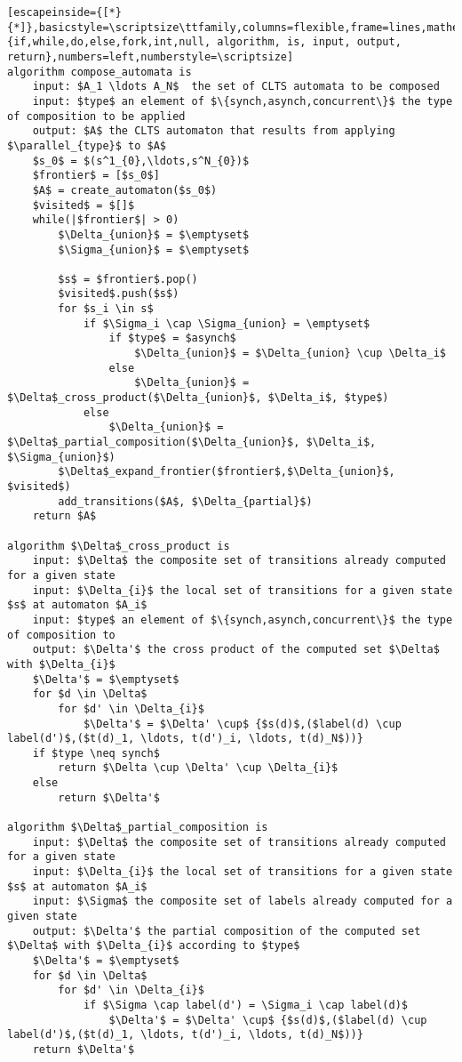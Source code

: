 \renewcommand{\ttdefault}{pcr}
\begin{lstlisting}[escapeinside={[*}{*]},basicstyle=\scriptsize\ttfamily,columns=flexible,frame=lines,mathescape=true,xleftmargin=3.0ex,keywordstyle=\textbf,morekeywords={if,while,do,else,fork,int,null, algorithm, is, input, output, return},numbers=left,numberstyle=\scriptsize]
algorithm compose_automata is
	input: $A_1 \ldots A_N$  the set of CLTS automata to be composed
	input: $type$ an element of $\{synch,asynch,concurrent\}$ the type of composition to be applied
	output: $A$ the CLTS automaton that results from applying $\parallel_{type}$ to $A$
	$s_0$ = $(s^1_{0},\ldots,s^N_{0})$
	$frontier$ = [$s_0$]
	$A$ = create_automaton($s_0$)
	$visited$ = $[]$
	while(|$frontier$| > 0)
		$\Delta_{union}$ = $\emptyset$
		$\Sigma_{union}$ = $\emptyset$		
		
		$s$ = $frontier$.pop()
		$visited$.push($s$)
		for $s_i \in s$ 
			if $\Sigma_i \cap \Sigma_{union} = \emptyset$		
				if $type$ = $asynch$
					$\Delta_{union}$ = $\Delta_{union} \cup \Delta_i$
				else
					$\Delta_{union}$ = $\Delta$_cross_product($\Delta_{union}$, $\Delta_i$, $type$)
			else
				$\Delta_{union}$ = $\Delta$_partial_composition($\Delta_{union}$, $\Delta_i$, $\Sigma_{union}$)
		$\Delta$_expand_frontier($frontier$,$\Delta_{union}$, $visited$)				
		add_transitions($A$, $\Delta_{partial}$)
	return $A$

algorithm $\Delta$_cross_product is
	input: $\Delta$ the composite set of transitions already computed for a given state
	input: $\Delta_{i}$ the local set of transitions for a given state $s$ at automaton $A_i$
	input: $type$ an element of $\{synch,asynch,concurrent\}$ the type of composition to	
	output: $\Delta'$ the cross product of the computed set $\Delta$ with $\Delta_{i}$
	$\Delta'$ = $\emptyset$
	for $d \in \Delta$
		for $d' \in \Delta_{i}$
			$\Delta'$ = $\Delta' \cup$ {$s(d)$,($label(d) \cup label(d')$,($t(d)_1, \ldots, t(d')_i, \ldots, t(d)_N$))}
	if $type \neq synch$
		return $\Delta \cup \Delta' \cup \Delta_{i}$
	else
		return $\Delta'$
	
algorithm $\Delta$_partial_composition is
	input: $\Delta$ the composite set of transitions already computed for a given state
	input: $\Delta_{i}$ the local set of transitions for a given state $s$ at automaton $A_i$
	input: $\Sigma$ the composite set of labels already computed for a given state		
	output: $\Delta'$ the partial composition of the computed set $\Delta$ with $\Delta_{i}$ according to $type$
	$\Delta'$ = $\emptyset$
	for $d \in \Delta$
		for $d' \in \Delta_{i}$
			if $\Sigma \cap label(d') = \Sigma_i \cap label(d)$
				$\Delta'$ = $\Delta' \cup$ {$s(d)$,($label(d) \cup label(d')$,($t(d)_1, \ldots, t(d')_i, \ldots, t(d)_N$))}
	return $\Delta'$
				

\end{lstlisting}